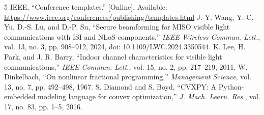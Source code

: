 \documentclass[conference]{IEEEtran}
\begin{document}
\begin{thebibliography}{5}
 IEEE, ``Conference templates.'' [Online]. Available: \url{https://www.ieee.org/conferences/publishing/templates.html}
 J.-Y. Wang, Y.-C. Yu, D.-S. Lu, and D.-P. Su, ``Secure beamforming for MISO visible light communications with ISI and NLoS components,'' \emph{IEEE Wireless Commun. Lett.}, vol. 13, no. 3, pp. 908--912, 2024, doi: 10.1109/LWC.2024.3350544.
 K. Lee, H. Park, and J. R. Barry, ``Indoor channel characteristics for visible light communications,'' \emph{IEEE Commun. Lett.}, vol. 15, no. 2, pp. 217--219, 2011.
 W. Dinkelbach, ``On nonlinear fractional programming,'' \emph{Management Science}, vol. 13, no. 7, pp. 492--498, 1967.
 S. Diamond and S. Boyd, ``CVXPY: A Python-embedded modeling language for convex optimization,'' \emph{J. Mach. Learn. Res.}, vol. 17, no. 83, pp. 1--5, 2016.
\end{thebibliography}
\end{document}
